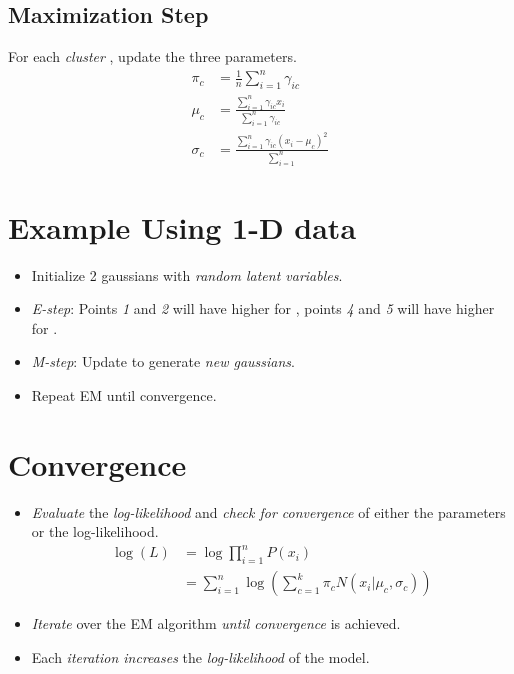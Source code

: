 \documentclass[
	number={6},
	title={Clustering}
]{cs584notes}
\begin{document}
\subsection{Maximization Step}\label{subsec:maximization-step}
For each \emph{cluster} , update the three parameters.
\begin{equation*}
\begin{aligned}
	\pi_{c} &= \frac{1}{n}\sum_{i=1}^{n} \gamma_{ic}\\
	\mu_{c} &= \frac{\sum_{i=1}^{n} \gamma_{ic} x_{i}}{\sum_{i=1}^{n} \gamma_{ic}}\\
	\sigma_{c} &= \frac{\sum_{i=1}^{n} \gamma_{ic}(x_{i} - \mu_{c})^{2}}{\sum_{i=1}^{n}}
\end{aligned}
\end{equation*}

\section{Example Using 1-D data}\label{sec:example-using-1-d-data}
\begin{itemize}
	\item Initialize 2 gaussians with \emph{random latent variables}.
	\item \emph{E-step}: Points \emph{1} and \emph{2} will have higher \data{$\gamma$} for , points \emph{4} and \emph{5} will have higher \data{$\gamma$} for .
	\item \emph{M-step}: Update \data{$\pi, \mu, \sigma$} to generate \emph{new gaussians}.
	\item Repeat EM until convergence.
\end{itemize}


\section{Convergence}\label{sec:convergence}
\begin{itemize}
	\item \emph{Evaluate} the \emph{log-likelihood} and \emph{check for convergence} of either the parameters or the log-likelihood.
	\begin{equation}
		\begin{aligned}
			\log(L) &= \log\prod_{i=1}^{n} P(x_{i})\\
					&= \sum_{i=1}^{n} \log \left( \sum_{c=1}^{k} \pi_{c} N(x_{i} | \mu_{c}, \sigma_{c}) \right)
		\end{aligned}
		\label{eq:convergence}
	\end{equation}
	\item \emph{Iterate} over the EM algorithm \emph{until convergence} is achieved.
	\item Each \emph{iteration increases} the \emph{log-likelihood} of the model.
\end{itemize}
\end{document}
